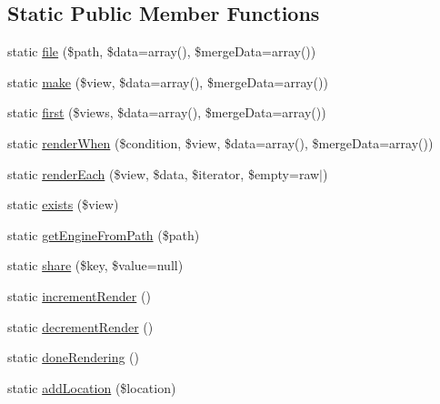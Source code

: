 \subsection*{Static Public Member Functions}
\begin{DoxyCompactItemize}
\item 
static \mbox{\hyperlink{class_illuminate_1_1_support_1_1_facades_1_1_view_a0575e6c6bf99f4006b7104bd09e75327}{file}} (\$path, \$data=array(), \$merge\+Data=array())
\item 
static \mbox{\hyperlink{class_illuminate_1_1_support_1_1_facades_1_1_view_ad33afb1b6bc32ec4e69c19dfa16dda99}{make}} (\$view, \$data=array(), \$merge\+Data=array())
\item 
static \mbox{\hyperlink{class_illuminate_1_1_support_1_1_facades_1_1_view_a90de5921ce235c9dd4fd7c53ac5af167}{first}} (\$views, \$data=array(), \$merge\+Data=array())
\item 
static \mbox{\hyperlink{class_illuminate_1_1_support_1_1_facades_1_1_view_ae3a376c26f94a9d72cbf5bdc1e5967e1}{render\+When}} (\$condition, \$view, \$data=array(), \$merge\+Data=array())
\item 
static \mbox{\hyperlink{class_illuminate_1_1_support_1_1_facades_1_1_view_ab816bf71b6dded544c2e8222cce87f43}{render\+Each}} (\$view, \$data, \$iterator, \$empty=\textquotesingle{}raw$\vert$\textquotesingle{})
\item 
static \mbox{\hyperlink{class_illuminate_1_1_support_1_1_facades_1_1_view_a8b17ded592f4c70188c7cf5849be67e1}{exists}} (\$view)
\item 
static \mbox{\hyperlink{class_illuminate_1_1_support_1_1_facades_1_1_view_af9bd6780d584b9ebb31edf99e7b471a6}{get\+Engine\+From\+Path}} (\$path)
\item 
static \mbox{\hyperlink{class_illuminate_1_1_support_1_1_facades_1_1_view_a3e3fa64ea9e47ce8eb08db3838dd2af7}{share}} (\$key, \$value=null)
\item 
static \mbox{\hyperlink{class_illuminate_1_1_support_1_1_facades_1_1_view_a5c887248f7b6bd09ca623e038a722858}{increment\+Render}} ()
\item 
static \mbox{\hyperlink{class_illuminate_1_1_support_1_1_facades_1_1_view_a273fac59a76d34811ab077a7096da378}{decrement\+Render}} ()
\item 
static \mbox{\hyperlink{class_illuminate_1_1_support_1_1_facades_1_1_view_a74a1cfc9f5696e486e332a1fdfcdeb76}{done\+Rendering}} ()
\item 
static \mbox{\hyperlink{class_illuminate_1_1_support_1_1_facades_1_1_view_a205f88687a55322e8dba8dc03feedf72}{add\+Location}} (\$location)

\end{DoxyCompactItemize}
